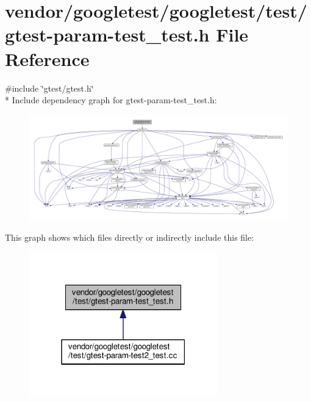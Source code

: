 \hypertarget{gtest-param-test__test_8h}{}\section{vendor/googletest/googletest/test/gtest-\/param-\/test\+\_\+test.h File Reference}
\label{gtest-param-test__test_8h}
{\ttfamily \#include \char`\"{}gtest/gtest.\+h\char`\"{}}\\*
Include dependency graph for gtest-\/param-\/test\+\_\+test.h\+:
\nopagebreak
\begin{figure}[H]
\begin{center}
\leavevmode
\includegraphics[width=350pt]{gtest-param-test__test_8h__incl}
\end{center}
\end{figure}
This graph shows which files directly or indirectly include this file\+:
\nopagebreak
\begin{figure}[H]
\begin{center}
\leavevmode
\includegraphics[width=231pt]{gtest-param-test__test_8h__dep__incl}
\end{center}
\end{figure}
